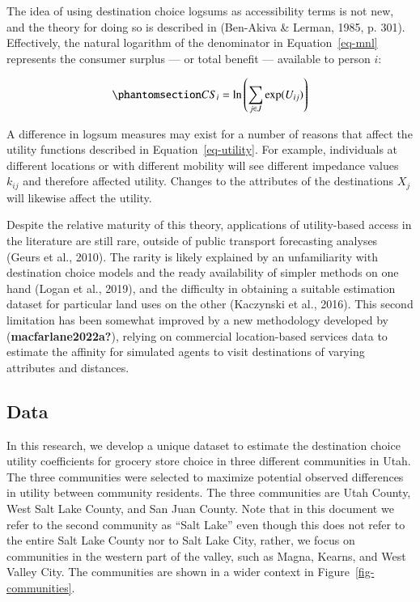 \documentclass[
  letterpaper,
  number,
  review,
  3p]{elsarticle}
\begin{document}
The idea of using destination choice logsums as accessibility terms is
not new, and the theory for doing so is described in (Ben-Akiva \&
Lerman, 1985, p. 301). Effectively, the natural logarithm of the
denominator in Equation~\ref{eq-mnl} represents the consumer surplus ---
or total benefit --- available to person \(i\):

\begin{equation}\phantomsection\label{eq-cs}{ CS_i = \ln\left(\sum_{j \in J} \exp(U_{ij})\right)}\end{equation}

A difference in logsum measures may exist for a number of reasons that
affect the utility functions described in Equation~\ref{eq-utility}. For
example, individuals at different locations or with different mobility
will see different impedance values \(k_{ij}\) and therefore affected
utility. Changes to the attributes of the destinations \(X_j\) will
likewise affect the utility.

Despite the relative maturity of this theory, applications of
utility-based access in the literature are still rare, outside of public
transport forecasting analyses (Geurs et al., 2010). The rarity is
likely explained by an unfamiliarity with destination choice models and
the ready availability of simpler methods on one hand (Logan et al.,
2019), and the difficulty in obtaining a suitable estimation dataset for
particular land uses on the other (Kaczynski et al., 2016). This second
limitation has been somewhat improved by a new methodology developed by
(\textbf{macfarlane2022a?}), relying on commercial location-based
services data to estimate the affinity for simulated agents to visit
destinations of varying attributes and distances.

\subsection{Data}\label{data}

In this research, we develop a unique dataset to estimate the
destination choice utility coefficients for grocery store choice in
three different communities in Utah. The three communities were selected
to maximize potential observed differences in utility between community
residents. The three communities are Utah County, West Salt Lake County,
and San Juan County. Note that in this document we refer to the second
community as ``Salt Lake'' even though this does not refer to the entire
Salt Lake County nor to Salt Lake City, rather, we focus on communities
in the western part of the valley, such as Magna, Kearns, and West
Valley City. The communities are shown in a wider context in
Figure~\ref{fig-communities}.
\end{document}
